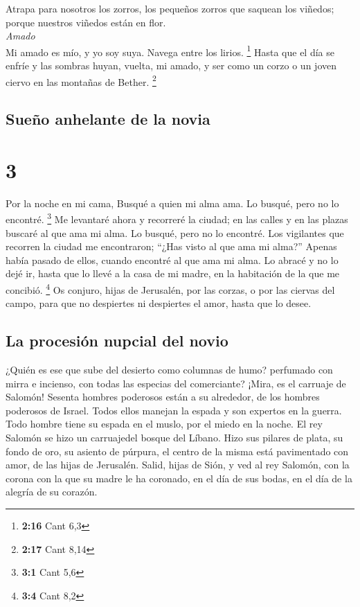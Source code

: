  Atrapa para nosotros los zorros, los pequeños zorros que
saquean los viñedos; porque nuestros viñedos están en flor.\\
\emph{Amado}\\
 Mi amado es mío, y yo soy suya. Navega entre los lirios.
\footnote{\textbf{2:16} Cant 6,3}  Hasta que el día se
enfríe y las sombras huyan, vuelta, mi amado, y ser como un corzo o un
joven ciervo en las montañas de Bether. \footnote{\textbf{2:17} Cant
  8,14}

\hypertarget{sueuxf1o-anhelante-de-la-novia}{%
\subsection{Sueño anhelante de la
novia}\label{sueuxf1o-anhelante-de-la-novia}}

\hypertarget{section-2}{%
\section{3}\label{section-2}}

 Por la noche en mi cama, Busqué a quien mi alma ama. Lo
busqué, pero no lo encontré. \footnote{\textbf{3:1} Cant 5,6}
 Me levantaré ahora y recorreré la ciudad; en las calles y
en las plazas buscaré al que ama mi alma. Lo busqué, pero no lo
encontré.  Los vigilantes que recorren la ciudad me
encontraron; ``¿Has visto al que ama mi alma?''  Apenas
había pasado de ellos, cuando encontré al que ama mi alma. Lo abracé y
no lo dejé ir, hasta que lo llevé a la casa de mi madre, en la
habitación de la que me concibió. \footnote{\textbf{3:4} Cant 8,2}
 Os conjuro, hijas de Jerusalén, por las corzas, o por las
ciervas del campo, para que no despiertes ni despiertes el amor, hasta
que lo desee.

\hypertarget{la-procesiuxf3n-nupcial-del-novio}{%
\subsection{La procesión nupcial del
novio}\label{la-procesiuxf3n-nupcial-del-novio}}

 ¿Quién es ese que sube del desierto como columnas de
humo? perfumado con mirra e incienso, con todas las especias del
comerciante?  ¡Mira, es el carruaje de Salomón! Sesenta
hombres poderosos están a su alrededor, de los hombres poderosos de
Israel.  Todos ellos manejan la espada y son expertos en
la guerra. Todo hombre tiene su espada en el muslo, por el miedo en la
noche.  El rey Salomón se hizo un carruajedel bosque del
Líbano.  Hizo sus pilares de plata, su fondo de oro, su
asiento de púrpura, el centro de la misma está pavimentado con amor, de
las hijas de Jerusalén.  Salid, hijas de Sión, y ved al
rey Salomón, con la corona con la que su madre le ha coronado, en el día
de sus bodas, en el día de la alegría de su corazón.

